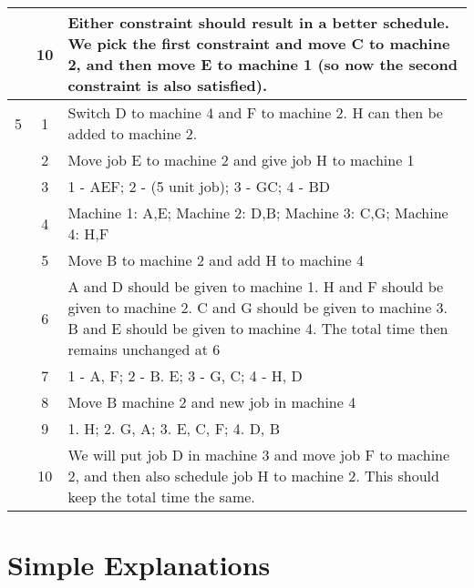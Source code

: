 \begin{tabularx}{\linewidth}{c c X}
	& 10 & Either constraint should result in a better schedule. We pick the first constraint and move C to machine 2, and then move E to machine 1 (so now the second constraint is also satisfied). \\
	\hline
	5 & 1 & Switch D to machine 4 and F to machine 2. H can then be added to machine 2. \\
	& 2 & Move job E to machine 2 and give job H to machine 1 \\
	& 3 & 1 - AEF; 2 - (5 unit job); 3 - GC; 4 - BD \\
	& 4 & Machine 1: A,E; Machine 2: D,B; Machine 3: C,G; Machine 4: H,F \\
	& 5 & Move B to machine 2 and add H to machine 4 \\
	& 6 & A and D should be given to machine 1. H and F should be given to machine 2. C and G should be given to machine 3. B and E should be given to machine 4. The total time then remains unchanged at 6 \\
	& 7 & 1 - A, F; 2 - B. E; 3 - G, C; 4 - H, D \\
	& 8 & Move B machine 2 and new job in machine 4 \\
	& 9 & 1. H; 2. G, A; 3. E, C, F; 4. D, B \\
	& 10 & We will put job D in machine 3 and move job F to machine 2, and then also schedule job H to machine 2. This should keep the total time the same. \\
	\hline
\end{tabularx}

\section{Simple Explanations}
\label{group2data}

